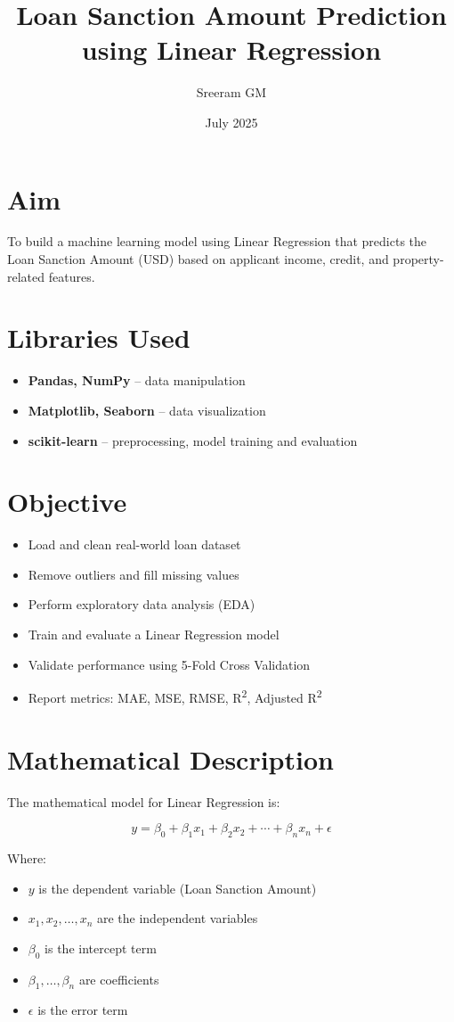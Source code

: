 \documentclass[12pt]{article}
\title{\textbf{Loan Sanction Amount Prediction using Linear Regression}}
\author{Sreeram GM}
\date{July 2025}
\begin{document}
\maketitle

\section*{Aim}
To build a machine learning model using Linear Regression that predicts the Loan Sanction Amount (USD) based on applicant income, credit, and property-related features.

\section*{Libraries Used}
\begin{itemize}
  \item \textbf{Pandas, NumPy} – data manipulation
  \item \textbf{Matplotlib, Seaborn} – data visualization
  \item \textbf{scikit-learn} – preprocessing, model training and evaluation
\end{itemize}

\section*{Objective}
\begin{itemize}
  \item Load and clean real-world loan dataset
  \item Remove outliers and fill missing values
  \item Perform exploratory data analysis (EDA)
  \item Train and evaluate a Linear Regression model
  \item Validate performance using 5-Fold Cross Validation
  \item Report metrics: MAE, MSE, RMSE, R\textsuperscript{2}, Adjusted R\textsuperscript{2}
\end{itemize}

\section*{Mathematical Description}
The mathematical model for Linear Regression is:

\[
y = \beta_0 + \beta_1 x_1 + \beta_2 x_2 + \cdots + \beta_n x_n + \epsilon
\]

Where:
\begin{itemize}
  \item $y$ is the dependent variable (Loan Sanction Amount)
  \item $x_1, x_2, \dots, x_n$ are the independent variables
  \item $\beta_0$ is the intercept term
  \item $\beta_1, \dots, \beta_n$ are coefficients
  \item $\epsilon$ is the error term
\end{itemize}
\end{document}
